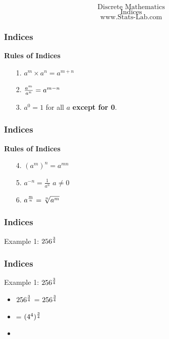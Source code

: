 \documentclass{beamer}
\begin{document}
\begin{frame}
{
\huge
\[ \mbox{Discrete Mathematics} \]
\[ \mbox{Indices} \]
}
{
\Large
\[ \mbox{www.Stats-Lab.com} \]
}
\end{frame}
\begin{frame}
\frametitle{Indices}
\LARGE
\vspace{-1cm}
\textbf{Rules of Indices}
\begin{enumerate}
\item[1.] $a^m\times a^n=a^{m+n}$ \bigskip  \vspace{1.5cm}
\item[2.] ${a^m\over a^n} =  a^{m-n}$ \bigskip \vspace{1.5cm}
\item[3.] $a^0 = 1$ for all $a$ \textbf{except for 0}.
\end{enumerate}
\end{frame}
\begin{frame}
\frametitle{Indices}
\LARGE
\vspace{-1cm}
\textbf{Rules of Indices}
\begin{enumerate}
\item[4.] $(a^m)^n=a^{mn}$ \bigskip \vspace{1.5cm}
\item[5.] $a^{-n} = \frac{1}{a^n}$ $a \neq 0 $ \bigskip \vspace{1.5cm}
\item[6.] $a^{{m \over n}} = \sqrt[n]{a^m}$
\end{enumerate}
\end{frame}
\begin{frame}
\frametitle{Indices}
\Large
\vspace{-3cm}
Example 1: $256^{3\over 4}$


\end{frame}
\begin{frame}
\frametitle{Indices}
\Large
Example 1: $256^{3\over 4}$

\begin{itemize}
\item $256^{3\over 4}$ = 
$256^{3\over 4}$ 
\item {} = $(4^4)^{3\over 4}$
\item 
\end{itemize}
\end{frame}
\end{document}

